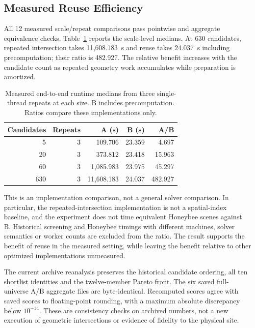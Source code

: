 \documentclass{llncs}
\begin{document}
\subsection{Measured Reuse Efficiency}
All 12 measured scale/repeat comparisons pass pointwise and aggregate equivalence checks. Table~\ref{tab:runtime} reports the scale-level medians. At 630 candidates, repeated intersection takes 11,608.183~s and reuse takes 24.037~s including precomputation; their ratio is 482.927. The relative benefit increases with the candidate count as repeated geometry work accumulates while preparation is amortized.

\begin{table}[tbp]
\caption{Measured end-to-end runtime medians from three single-thread repeats at each size. B includes precomputation. Ratios compare these implementations only.}
\label{tab:runtime}\centering
\begin{tabular}{rrrrr}\toprule
Candidates & Repeats & A (s) & B (s) & A/B\\\midrule
5 & 3 & 109.706 & 23.359 & 4.697\\
20 & 3 & 373.812 & 23.418 & 15.963\\
60 & 3 & 1,085.983 & 23.975 & 45.297\\
630 & 3 & 11,608.183 & 24.037 & 482.927\\\bottomrule
\end{tabular}
\end{table}


This is an implementation comparison, not a general solver comparison. In particular, the repeated-intersection implementation is not a spatial-index baseline, and the experiment does not time equivalent Honeybee scenes against B. Historical screening and Honeybee timings with different machines, solver semantics or worker counts are excluded from the ratio. The result supports the benefit of reuse in the measured setting, while leaving the benefit relative to other optimized implementations unmeasured.

The current archive reanalysis preserves the historical candidate ordering, all ten shortlist identities and the twelve-member Pareto front. The six saved full-universe A/B aggregate files are byte-identical. Recomputed scores agree with saved scores to floating-point rounding, with a maximum absolute discrepancy below $10^{-14}$. These are consistency checks on archived numbers, not a new execution of geometric intersections or evidence of fidelity to the physical site.
\end{document}
